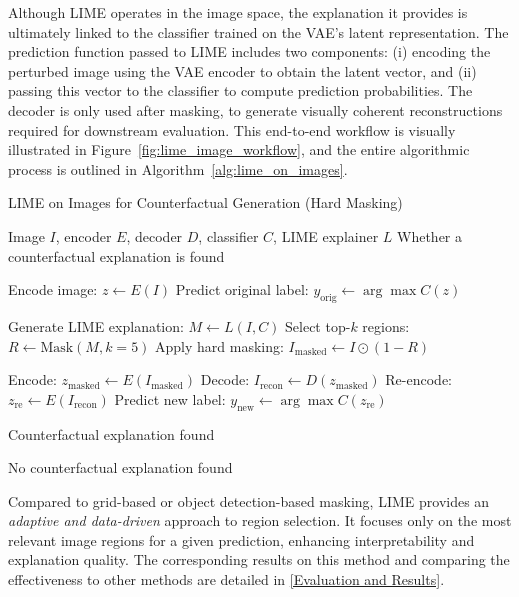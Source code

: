Although LIME operates in the image space, the explanation it provides is ultimately linked to the classifier trained on the VAE’s latent representation. The prediction function passed to LIME includes two components: (i) encoding the perturbed image using the VAE encoder to obtain the latent vector, and (ii) passing this vector to the classifier to compute prediction probabilities. The decoder is only used after masking, to generate visually coherent reconstructions required for downstream evaluation. This end-to-end workflow is visually illustrated in Figure~\ref{fig:lime_image_workflow}, and the entire algorithmic process is outlined in Algorithm~\ref{alg:lime_on_images}.



\begin{algorithm}[ht]
\caption{LIME on Images for Counterfactual Generation (Hard Masking)}
\label{alg:lime_on_images}
\begin{algorithmic}[1]
\REQUIRE Image $I$, encoder $E$, decoder $D$, classifier $C$, LIME explainer $L$
\ENSURE Whether a counterfactual explanation is found

\STATE Encode image: $z \leftarrow E(I)$
\STATE Predict original label: $y_{\text{orig}} \leftarrow \arg\max C(z)$

\STATE Generate LIME explanation: $M \leftarrow L(I, C)$
\STATE Select top-$k$ regions: $R \leftarrow \text{Mask}(M, k=5)$
\STATE Apply hard masking: $I_{\text{masked}} \leftarrow I \odot (1 - R)$

\STATE Encode: $z_{\text{masked}} \leftarrow E(I_{\text{masked}})$
\STATE Decode: $I_{\text{recon}} \leftarrow D(z_{\text{masked}})$
\STATE Re-encode: $z_{\text{re}} \leftarrow E(I_{\text{recon}})$
\STATE Predict new label: $y_{\text{new}} \leftarrow \arg\max C(z_{\text{re}})$

    \RETURN Counterfactual explanation found
\ENDIF

\RETURN No counterfactual explanation found
\end{algorithmic}
\end{algorithm}

Compared to grid-based or object detection-based masking, LIME provides an \emph{adaptive and data-driven} approach to region selection. It focuses only on the most relevant image regions for a given prediction, enhancing interpretability and explanation quality. The corresponding results on this method and comparing the effectiveness to other methods are detailed in \cref{Evaluation and Results}.





